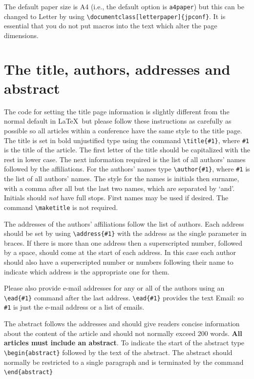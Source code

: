 \documentclass[a4paper]{jpconf}
\begin{document}
The default paper size is A4 (i.e., the default option is {\tt a4paper}) but this can be changed to Letter by
using \verb"\documentclass[letterpaper]{jpconf}". It is essential that you do not put macros into the text which alter the page dimensions.

\section{The title, authors, addresses and abstract}
The code for setting the title page information is slightly different from
the normal default in \LaTeX\ but please follow these instructions as carefully as possible so all articles within a conference have the same style to the title page.
The title is set in bold unjustified type using the command
\verb"\title{#1}", where \verb"#1" is the title of the article. The
first letter of the title should be capitalized with the rest in lower case.
The next information required is the list of all authors' names followed by
the affiliations. For the authors' names type \verb"\author{#1}",
where \verb"#1" is the
list of all authors' names. The style for the names is initials then
surname, with a comma after all but the last
two names, which are separated by `and'. Initials should {\it not} have
full stops. First names may be used if desired. The command \verb"\maketitle" is not
required.

The addresses of the authors' affiliations follow the list of authors.
Each address should be set by using
\verb"\address{#1}" with the address as the single parameter in braces.
If there is more
than one address then a superscripted number, followed by a space, should come at the start of
each address. In this case each author should also have a superscripted number or numbers following their name to indicate which address is the appropriate one for them.

Please also provide e-mail addresses for any or all of the authors using an \verb"\ead{#1}" command after the last address. \verb"\ead{#1}" provides the text Email: so \verb"#1" is just the e-mail address or a list of emails.

The abstract follows the addresses and
should give readers concise information about the content
of the article and should not normally exceed 200
words. {\bf All articles must include an abstract}. To indicate the start
of the abstract type \verb"\begin{abstract}" followed by the text of the
abstract.  The abstract should normally be restricted
to a single paragraph and is terminated by the command
\verb"\end{abstract}"
\end{document}
